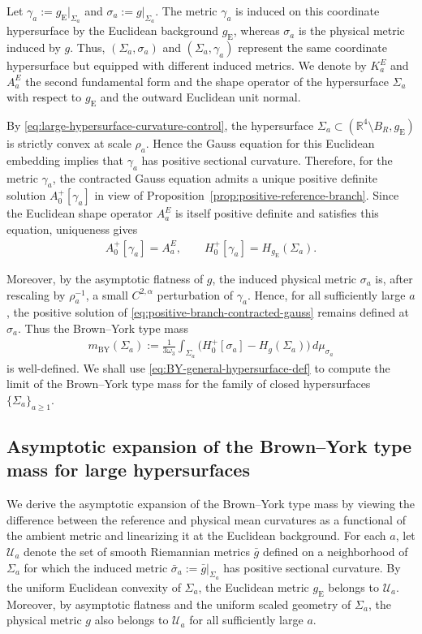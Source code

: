 \documentclass[10pt]{amsart}
\newcommand{\R}{\mathbb{R}}
\newcommand{\gE}{g_{\mathrm{E}}}
\newcommand{\BY}{\mathrm{BY}}
\theoremstyle{plain}
\theoremstyle{remark}
\begin{document}
	Let $\gamma_a:=\gE|_{\Sigma_a}$ and $\sigma_a:=g|_{\Sigma_a}$. The metric $\gamma_a$ is induced
	on this coordinate hypersurface by the Euclidean background $\gE$, whereas
	$\sigma_a$ is the physical metric induced by $g$. Thus, $(\Sigma_a,\sigma_a)$ and $(\Sigma_a,\gamma_a)$ represent the same coordinate hypersurface but equipped with different induced metrics. We denote by
	$K_a^E$ and $A_a^E$ the second fundamental form and the shape operator of the hypersurface $\Sigma_a$ with respect to $\gE$ and the outward Euclidean unit normal. 
	
	By \eqref{eq:large-hypersurface-curvature-control}, the hypersurface
	$\Sigma_a\subset(\R^4\setminus B_R,\gE)$ is strictly convex at scale
	$\rho_a$. Hence the Gauss equation for this Euclidean embedding implies that
	$\gamma_a$ has positive sectional curvature. Therefore, for the metric
	$\gamma_a$, the contracted Gauss equation admits a unique positive definite
	solution $A_0^+[\gamma_a]$ in view of
	Proposition~\ref{prop:positive-reference-branch}. Since the Euclidean shape operator $A_a^E$ is itself positive definite and satisfies this equation, uniqueness gives \begin{align} A_0^+[\gamma_a]=A_a^E, \qquad H_0^+[\gamma_a]=H_{\gE}(\Sigma_a). \end{align}
	
	Moreover, by the asymptotic flatness of $g$, the induced physical metric
	$\sigma_a$ is, after rescaling by $\rho_a^{-1}$, a small
	$C^{2,\alpha}$ perturbation of $\gamma_a$. Hence, for all sufficiently large $a$, the positive solution of
	\eqref{eq:positive-branch-contracted-gauss} remains defined at $\sigma_a$.
	Thus the Brown--York type mass
	\begin{align}\label{eq:BY-general-hypersurface-def}
		m_{\BY}(\Sigma_a)
		:=
		\frac{1}{3\omega_3}
		\int_{\Sigma_a}
		\bigl(
		H_0^+[\sigma_a]-H_g(\Sigma_a)
		\bigr)\,d\mu_{\sigma_a}
	\end{align}
	is well-defined. We shall use \eqref{eq:BY-general-hypersurface-def} to compute
	the limit of the Brown--York type mass for the family of closed hypersurfaces
	$\{\Sigma_a\}_{a\geq 1}$.
	
	
	\subsection{Asymptotic expansion of the Brown--York type mass for large hypersurfaces}\label{subsec:large-surface-By-mass}
	
	We derive the asymptotic expansion of the Brown--York type mass by viewing
	the difference between the reference and physical mean curvatures as a
	functional of the ambient metric and linearizing it at the Euclidean
	background. For each $a$, let $\mathcal U_a$ denote the set of smooth
	Riemannian metrics $\bar g$ defined on a neighborhood of $\Sigma_a$ for
	which the induced metric $\bar\sigma_a:=\bar g|_{\Sigma_a}$ has positive sectional curvature. By the uniform Euclidean convexity of
	$\Sigma_a$, the Euclidean metric $\gE$ belongs to $\mathcal U_a$. Moreover,
	by asymptotic flatness and the uniform scaled geometry of $\Sigma_a$, the
	physical metric $g$ also belongs to $\mathcal U_a$ for all sufficiently
	large $a$.
	
\end{document}
